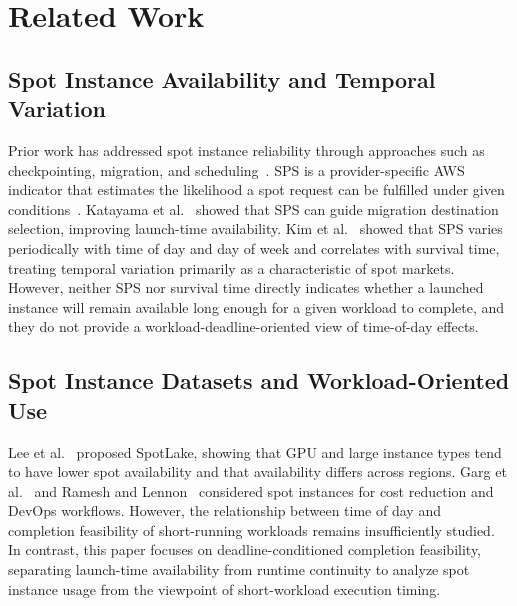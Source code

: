 \documentclass[runningheads]{llncs}
\begin{document}
\section{Related Work}

\subsection{Spot Instance Availability and Temporal Variation}

Prior work has addressed spot instance reliability through approaches such as checkpointing, migration, and scheduling~\cite{Lin2022Survey}. SPS is a provider-specific AWS indicator that estimates the likelihood a spot request can be fulfilled under given conditions~\cite{AWSSPS}. Katayama et al.~\cite{Katayama2022} showed that SPS can guide migration destination selection, improving launch-time availability. Kim et al.~\cite{Kim2024SpotInterruption} showed that SPS varies periodically with time of day and day of week and correlates with survival time, treating temporal variation primarily as a characteristic of spot markets. However, neither SPS nor survival time directly indicates whether a launched instance will remain available long enough for a given workload to complete, and they do not provide a workload-deadline-oriented view of time-of-day effects.

\subsection{Spot Instance Datasets and Workload-Oriented Use}

Lee et al.~\cite{Lee2022SpotLake} proposed SpotLake, showing that GPU and large instance types tend to have lower spot availability and that availability differs across regions. Garg et al.~\cite{Garg2025} and Ramesh and Lennon~\cite{Ramesh2025} considered spot instances for cost reduction and DevOps workflows. However, the relationship between time of day and completion feasibility of short-running workloads remains insufficiently studied. In contrast, this paper focuses on deadline-conditioned completion feasibility, separating launch-time availability from runtime continuity to analyze spot instance usage from the viewpoint of short-workload execution timing.

\end{document}
